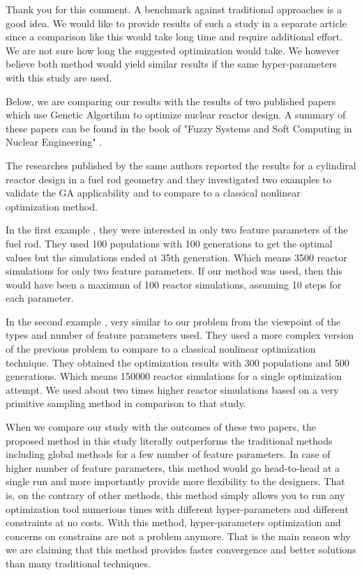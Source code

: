 \documentclass{ar2rc}
\begin{document}
    \Response Thank you for this comment. A benchmark against traditional approaches is a good idea. We would like to provide results of such a study in a separate article since a comparison like this would take long time and require additional effort. We are not sure how long the suggested optimization would take. We however believe both method would yield similar results if the same hyper-parameters with this study are used.

    Below, we are comparing our results with the results of two published papers which use Genetic Algortihm to optimize nuclear reactor design. A summary of these papers can be found in the book of "Fuzzy Systems and Soft Computing in Nuclear Engineering" \cite{pereira2000}.

    The researches \cite{pereira1999, pereira2003} published by the same authors reported the results for a cylindiral reactor design in a fuel rod geometry and they investigated two examples to validate the GA applicability and to compare to a classical nonlinear optimization method.

    In the first example \cite{pereira1999}, they were interested in only two feature parameters of the fuel rod. They used 100 populations with 100 generations to get the optimal values but the simulations ended at 35th generation. Which means 3500 reactor simulations for only two feature parameters. If our method was used, then this would have been a maximum of 100 reactor simulations, assuming 10 steps for each parameter.

    In the second example \cite{pereira2003}, very similar to our problem from the viewpoint of the types and number of feature parameters used. They used a more complex version of the previous problem to compare to a classical nonlinear optimization technique. They obtained the optimization results with 300 populations and 500 generations. Which means 150000 reactor simulations for a single optimization attempt. We used about two times higher reactor simulations based on a very primitive sampling method in comparison to that study.

    When we compare our study with the outcomes of these two papers, the proposed method in this study literally outperforms the traditional methods including global methods for a few number of feature parameters. In case of higher number of feature parameters, this method would go head-to-head at a single run and more importantly provide more flexibility to the designers. That is, on the contrary of other methods, this method simply allows you to run any optimization tool numerious times with different hyper-parameters and different constraints at no costs. With this method, hyper-parameters optimization and concerns on constrains are not a problem anymore. That is the main reason why we are claiming that this method provides faster convergence and better solutions than many traditional techniques.
\end{document}
